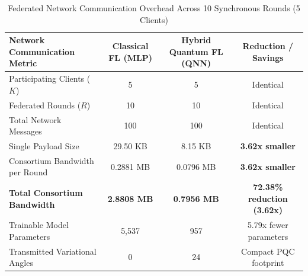 \begin{table}[t]
\centering
\caption{Federated Network Communication Overhead Across 10 Synchronous Rounds (5 Clients)}
\label{tab:communication_overhead}
\begin{tabular}{lccc}
\hline
\textbf{Network Communication Metric} & \textbf{Classical FL (MLP)} & \textbf{Hybrid Quantum FL (QNN)} & \textbf{Reduction / Savings} \\
\hline
Participating Clients ($K$) & 5 & 5 & Identical \\
Federated Rounds ($R$) & 10 & 10 & Identical \\
Total Network Messages & 100 & 100 & Identical \\
Single Payload Size & 29.50 KB & 8.15 KB & \textbf{3.62x smaller} \\
Consortium Bandwidth per Round & 0.2881 MB & 0.0796 MB & \textbf{3.62x smaller} \\
\textbf{Total Consortium Bandwidth} & \textbf{2.8808 MB} & \textbf{0.7956 MB} & \textbf{72.38\% reduction (3.62x)} \\
Trainable Model Parameters & 5,537 & 957 & 5.79x fewer parameters \\
Transmitted Variational Angles & 0 & 24 & Compact PQC footprint \\
\hline
\end{tabular}
\end{table}
